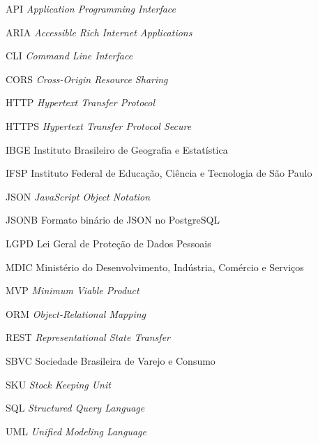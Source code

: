 \begin{siglas}
  \item[API] \textit{Application Programming Interface}
  \item[ARIA] \textit{Accessible Rich Internet Applications}
  \item[CLI] \textit{Command Line Interface}
  \item[CORS] \textit{Cross-Origin Resource Sharing}
  \item[HTTP] \textit{Hypertext Transfer Protocol}
  \item[HTTPS] \textit{Hypertext Transfer Protocol Secure}
  \item[IBGE] Instituto Brasileiro de Geografia e Estatística
  \item[IFSP] Instituto Federal de Educação, Ciência e Tecnologia de São Paulo
  \item[JSON] \textit{JavaScript Object Notation}
  \item[JSONB] Formato binário de JSON no PostgreSQL
  \item[LGPD] Lei Geral de Proteção de Dados Pessoais
  \item[MDIC] Ministério do Desenvolvimento, Indústria, Comércio e Serviços
  \item[MVP] \textit{Minimum Viable Product}
  \item[ORM] \textit{Object-Relational Mapping}
  \item[REST] \textit{Representational State Transfer}
  \item[SBVC] Sociedade Brasileira de Varejo e Consumo
  \item[SKU] \textit{Stock Keeping Unit}
  \item[SQL] \textit{Structured Query Language}
  \item[UML] \textit{Unified Modeling Language}
\end{siglas}
